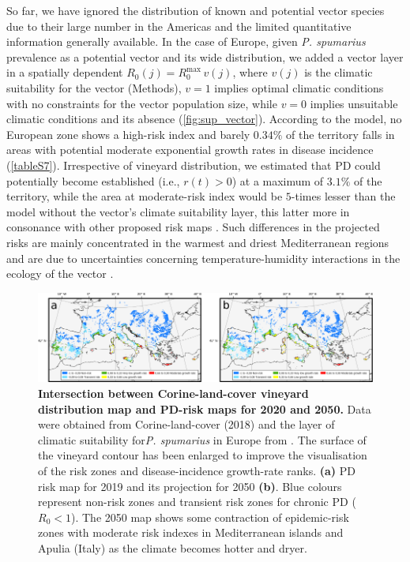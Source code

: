     So far, we have ignored the distribution of known and potential vector
    species due to their large number in the Americas and the limited
    quantitative information generally available. In the case of Europe, given
    \textit{P. spumarius} prevalence as a potential
    vector and its wide distribution, we added	a vector layer in a spatially
    dependent $R_0(j) = R_0^{\textrm{max}}\, v(j)$, where $v(j)$ is the
    climatic
    suitability for the vector (Methods), $v=1$ implies optimal climatic
    conditions
    with no constraints for the vector population size, while $v=0$ implies
    unsuitable climatic conditions and its absence (\cref{fig:sup_vector}).
    According to the model, no European zone shows a high-risk index and barely
$0.34\%$ of the territory falls in areas with potential moderate exponential
    growth rates in disease incidence (\cref{tableS7}). Irrespective of
    vineyard distribution, we estimated that PD could potentially become
    established (i.e., $r(t) > 0$) at a maximum of $3.1\%$ of the territory,
    while the area at moderate-risk index would be $5$-times lesser than the
    model without the vector's climate suitability layer, this latter more in
    consonance with other proposed risk maps \cite{Godefroid2019,Bragard2019}.
    Such differences in the projected risks are mainly concentrated in the
    warmest and driest Mediterranean regions and are due to uncertainties
    concerning temperature-humidity interactions in the ecology of the vector
    \cite{Godefroid2021}.

    \begin{figure}[H]
        \includegraphics[width=1\textwidth]{Figures/Fig6.png}
        \caption{\textbf{Intersection between Corine-land-cover vineyard
                distribution map and PD-risk maps for 2020 and 2050.}  Data
            were obtained from
            Corine-land-cover (2018) and the layer of climatic suitability
            for\textit{P.
                spumarius} in Europe from \cite{Godefroid2021}. The surface of
            the vineyard
            contour has been enlarged to improve the visualisation of the risk
            zones and
            disease-incidence growth-rate ranks. \textbf{(a)} PD risk map for
            2019 and its
            projection for 2050 \textbf{(b)}. Blue colours represent non-risk
            zones and
            transient risk zones for chronic PD ($R_0 < 1$). The 2050 map shows
            some
            contraction of epidemic-risk zones with moderate risk indexes in
            Mediterranean
            islands and Apulia (Italy) as the climate becomes hotter and
            dryer.}
        \label{fig6}
    \end{figure}

